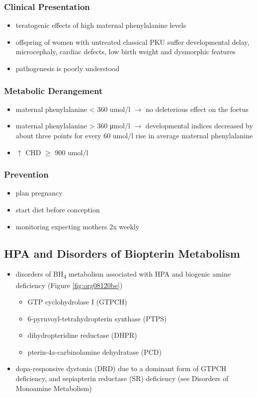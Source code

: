 \documentclass[12pt]{scrartcl}
\begin{document}
\subsubsection{Clinical Presentation}
\label{sec:org973ca2d}
\begin{itemize}
\item teratogenic effects of high maternal phenylalanine levels
\item offspring of women with untreated classical PKU suffer developmental
delay, microcephaly, cardiac defects, low birth weight and
dysmorphic features
\item pathogenesis is poorly understood
\end{itemize}
\subsubsection{Metabolic Derangement}
\label{sec:org227aaa9}
\begin{itemize}
\item maternal phenylalanine \textless{} 360 umol/l \(\to\) no deleterious effect on the foetus
\item maternal phenylalanine \textgreater{} 360 μmol/l \(\to\) developmental indices
decreased by about three points for every 60 umol/l rise in average
maternal phenylalanine
\item \(\uparrow\) CHD \(\ge\) 900 umol/l
\end{itemize}
\subsubsection{Prevention}
\label{sec:orga3df2cc}
\begin{itemize}
\item plan pregnancy
\item start diet before conception
\item monitoring expecting mothers 2x weekly
\end{itemize}

\subsection{HPA and Disorders of Biopterin Metabolism}
\label{sec:orge2fe32a}
\begin{itemize}
\item disorders of BH\textsubscript{4} metabolism associated with HPA and biogenic amine deficiency (Figure \ref{fig:org08120be})
\begin{itemize}
\item GTP cyclohydrolase I (GTPCH)
\item 6-pyruvoyl-tetrahydropterin synthase (PTPS)
\item dihydropteridine reductase (DHPR)
\item pterin-4a-carbinolamine dehydratase (PCD)
\end{itemize}
\item dopa-responsive dystonia (DRD) due to a dominant form of GTPCH
deficiency, and sepiapterin reductase (SR) deficiency (see Disorders of Monoamine Metabolism)
\end{itemize}
\end{document}
